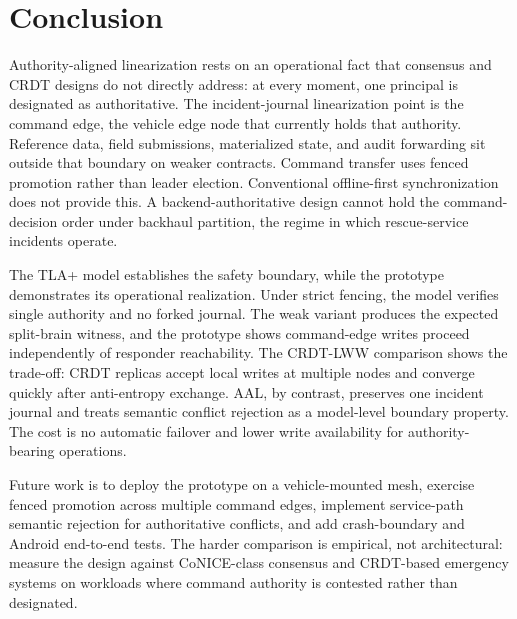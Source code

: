 \section{Conclusion}

Authority-aligned linearization rests on an operational fact that consensus and
CRDT designs do not directly address: at every moment, one principal is
designated as authoritative. The incident-journal linearization point is the
command edge, the vehicle edge node that currently holds that authority.
Reference data, field submissions, materialized state, and audit forwarding sit
outside that boundary on weaker contracts. Command transfer uses fenced promotion
rather than leader election. Conventional offline-first synchronization does
not provide this. A backend-authoritative design cannot hold the command-decision
order under backhaul partition, the regime in which rescue-service incidents
operate.

The TLA+ model establishes the safety boundary, while the prototype demonstrates
its operational realization. Under strict fencing, the model verifies single
authority and no forked journal. The weak variant produces the expected
split-brain witness, and the prototype shows command-edge writes proceed
independently of responder reachability. The CRDT-LWW comparison shows the
trade-off: CRDT replicas accept local writes at multiple nodes and converge
quickly after anti-entropy exchange. AAL, by contrast, preserves one incident
journal and treats semantic conflict rejection as a model-level boundary
property. The cost is no automatic failover and lower write availability for
authority-bearing operations.

Future work is to deploy the prototype on a vehicle-mounted mesh, exercise fenced
promotion across multiple command edges, implement service-path semantic
rejection for authoritative conflicts, and add crash-boundary and Android
end-to-end tests. The harder comparison is empirical, not architectural: measure
the design against CoNICE-class consensus and CRDT-based emergency systems on
workloads where command authority is contested rather than designated.
